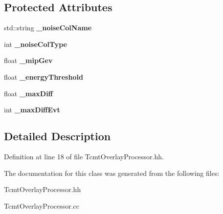 \subsection*{Protected Attributes}
\begin{DoxyCompactItemize}
\item 
std::string {\bfseries \_\-noiseColName}\label{classCALICE_1_1TcmtOverlayProcessor_ae5a9f82b50886731200994d68dd96909}

\item 
int {\bfseries \_\-noiseColType}\label{classCALICE_1_1TcmtOverlayProcessor_aa618736308ff49da01203210481bd9be}

\item 
float {\bfseries \_\-mipGev}\label{classCALICE_1_1TcmtOverlayProcessor_a9a4eb5151f1d1f92e91d40e6a3a1c4bb}

\item 
float {\bfseries \_\-energyThreshold}\label{classCALICE_1_1TcmtOverlayProcessor_ad34887a6904dc0accc0b84c810a175d7}

\item 
float {\bfseries \_\-maxDiff}\label{classCALICE_1_1TcmtOverlayProcessor_a4f6d55ec0342e5cd5576f5ecbc8b905c}

\item 
int {\bfseries \_\-maxDiffEvt}\label{classCALICE_1_1TcmtOverlayProcessor_ae90c13dd293d0acecd224d9e65a5737d}

\end{DoxyCompactItemize}


\subsection{Detailed Description}


Definition at line 18 of file TcmtOverlayProcessor.hh.

The documentation for this class was generated from the following files:\begin{DoxyCompactItemize}
\item 
TcmtOverlayProcessor.hh\item 
TcmtOverlayProcessor.cc\end{DoxyCompactItemize}

